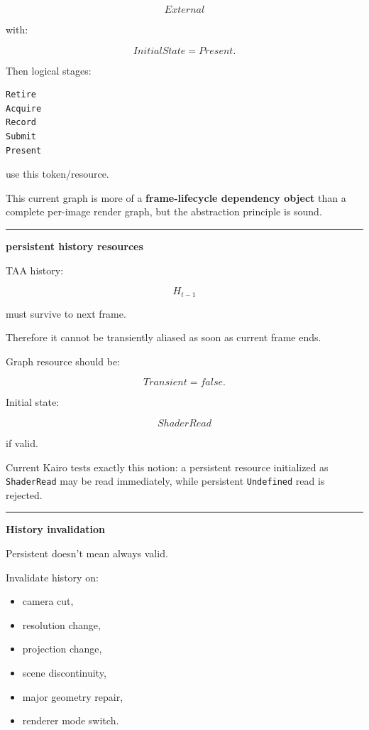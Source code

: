 \[
External
\]

with:

\[
InitialState=Present.
\]

Then logical stages:

\begin{verbatim}
Retire
Acquire
Record
Submit
Present
\end{verbatim}

use this token/resource.

This current graph is more of a \textbf{frame-lifecycle dependency object} than a complete per-image render graph, but the abstraction principle is sound.

\begin{center}\rule{0.5\linewidth}{0.5pt}\end{center}

\textbf{persistent history resources}

TAA history:

\[
H_{t-1}
\]

must survive to next frame.

Therefore it cannot be transiently aliased as soon as current frame ends.

Graph resource should be:

\[
Transient=false.
\]

Initial state:

\[
ShaderRead
\]

if valid.

Current Kairo tests exactly this notion: a persistent resource initialized as \texttt{ShaderRead} may be read immediately, while persistent \texttt{Undefined} read is rejected.

\begin{center}\rule{0.5\linewidth}{0.5pt}\end{center}

\textbf{History invalidation}

Persistent doesn't mean always valid.

Invalidate history on:

\begin{itemize}
\tightlist
\item
  camera cut,
\item
  resolution change,
\item
  projection change,
\item
  scene discontinuity,
\item
  major geometry repair,
\item
  renderer mode switch.
\end{itemize}

